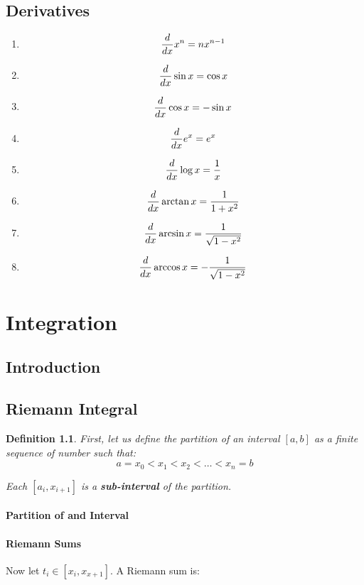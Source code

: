 \documentclass{book}
\newtheorem{definition}{Definition}[section]
\begin{document}
\section*{Derivatives}
\begin{enumerate}
    
    \item $$ \frac{d}{dx} x^n=nx^{n-1}$$
    \item $$ \frac{d}{dx} \sin x = \cos x$$
    \item $$ \frac{d}{dx} \cos x = - \sin x$$
    \item $$ \frac{d}{dx} e^x=e^x$$
    \item $$ \frac{d}{dx} \log x = \frac{1}{x}$$
    \item $$ \frac{d}{dx} \arctan x= \frac{1}{1+x^2}$$
    \item $$ \frac{d}{dx} \arcsin x= \frac{1}{\sqrt{1-x^2}}$$
    \item $$ \frac{d}{dx} \arccos x= -\frac{1}{\sqrt{1-x^2}}$$
    
    
\end{enumerate}


\chapter{Integration}

\section{Introduction}

\section{Riemann Integral}

\begin{definition}First, let us define the partition of an interval $[a,b]$ as a finite sequence of number such that:
$$a=x_0<x_1<x_2<\dots <x_n=b$$

Each $[a_i,x_{i+1}]$ is a \textbf{sub-interval} of the partition.
\subsubsection*{Partition of and Interval}
\end{definition}


\subsubsection*{Riemann Sums}
Now let $t_i\in [x_i,x_{x+1}]$. A Riemann sum is:
\end{document}
